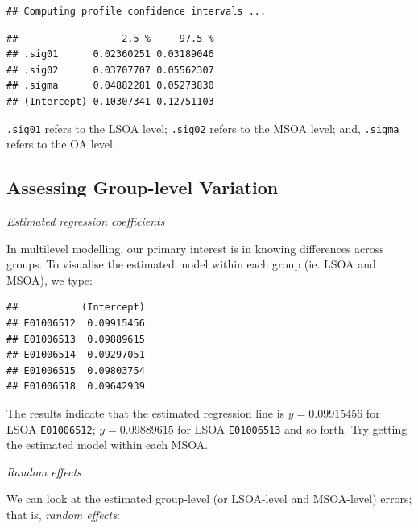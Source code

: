 \documentclass[
]{book}
\newenvironment{Shaded}{\begin{snugshade}}{\end{snugshade}}
\newcommand{\DecValTok}[1]{\textcolor[rgb]{0.00,0.00,0.81}{#1}}
\newcommand{\KeywordTok}[1]{\textcolor[rgb]{0.13,0.29,0.53}{\textbf{#1}}}
\newcommand{\NormalTok}[1]{#1}
\newcommand{\OperatorTok}[1]{\textcolor[rgb]{0.81,0.36,0.00}{\textbf{#1}}}
\newcommand{\StringTok}[1]{\textcolor[rgb]{0.31,0.60,0.02}{#1}}
\begin{document}
\begin{verbatim}
## Computing profile confidence intervals ...
\end{verbatim}

\begin{verbatim}
##                  2.5 %     97.5 %
## .sig01      0.02360251 0.03189046
## .sig02      0.03707707 0.05562307
## .sigma      0.04882281 0.05273830
## (Intercept) 0.10307341 0.12751103
\end{verbatim}

\texttt{.sig01} refers to the LSOA level; \texttt{.sig02} refers to the MSOA level; and, \texttt{.sigma} refers to the OA level.

\hypertarget{assessing-group-level-variation}{%
\subsection{Assessing Group-level Variation}\label{assessing-group-level-variation}}

\emph{Estimated regression coefficients}

In multilevel modelling, our primary interest is in knowing differences across groups. To visualise the estimated model within each group (ie. LSOA and MSOA), we type:

\begin{Shaded}
\end{Shaded}

\begin{verbatim}
##           (Intercept)
## E01006512  0.09915456
## E01006513  0.09889615
## E01006514  0.09297051
## E01006515  0.09803754
## E01006518  0.09642939
\end{verbatim}

The results indicate that the estimated regression line is \(y = 0.09915456\) for LSOA \texttt{E01006512}; \(y = 0.09889615\) for LSOA \texttt{E01006513} and so forth. Try getting the estimated model within each MSOA.

\emph{Random effects}

We can look at the estimated group-level (or LSOA-level and MSOA-level) errors; that is, \emph{random effects}:

\begin{Shaded}
\end{Shaded}
\end{document}
